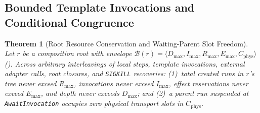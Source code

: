 \documentclass[11pt,a4paper]{article}
\newtheorem{theorem}{Theorem}[section]
\theoremstyle{definition}
\theoremstyle{remark}
\begin{document}
\subsection{Bounded Template Invocations and Conditional Congruence}

\begin{theorem}[Root Resource Conservation and Waiting-Parent Slot Freedom]
\label{thm:conservation}
Let $r$ be a composition root with envelope $\mathcal{B}(r) = \langle D_{\max}, I_{\max}, R_{\max}, E_{\max}, C_{\text{phys}} \rangle$ (). Across arbitrary interleavings of local steps, template invocations, external adapter calls, root closures, and \texttt{SIGKILL} recoveries: (1)~total created runs in $r$'s tree never exceed $R_{\max}$, invocations never exceed $I_{\max}$, effect reservations never exceed $E_{\max}$, and depth never exceeds $D_{\max}$; and (2)~a parent run suspended at \texttt{AwaitInvocation} occupies zero physical transport slots in $C_{\text{phys}}$.
\end{theorem}
\end{document}
